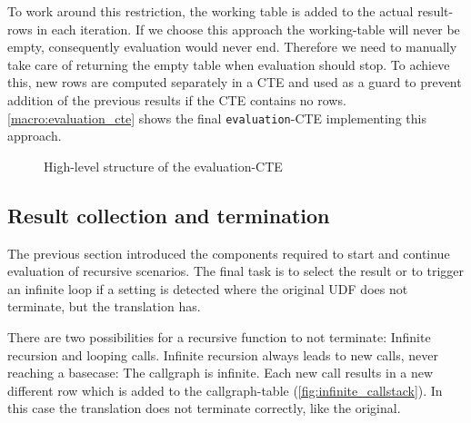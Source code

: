 To work around this restriction, the working table is added to the actual result-rows in each iteration. If we choose this approach the working-table will never be empty, consequently evaluation would never end. Therefore we need to manually take care of returning the empty table when evaluation should stop. To achieve this, new rows are computed separately in a CTE and used as a guard to prevent addition of the previous results if the CTE contains no rows. \autoref{macro:evaluation_cte} shows the final \texttt{evaluation}-CTE implementing this approach.

\begin{figure}[h!]\centering
  \caption{High-level structure of the evaluation-CTE}\label{macro:evaluation_cte}
\end{figure}

\subsection{Result collection and termination}

The previous section introduced the components required to start and continue evaluation of recursive scenarios. The final task is to select the result or to trigger an infinite loop if a setting is detected where the original UDF does not terminate, but the translation has.

There are two possibilities for a recursive function to not terminate: Infinite recursion and looping calls. Infinite recursion always leads to new calls, never reaching a basecase: The callgraph is infinite. Each new call results in a new different row which is added to the callgraph-table (\autoref{fig:infinite_callstack}). In this case the translation does not terminate correctly, like the original.

